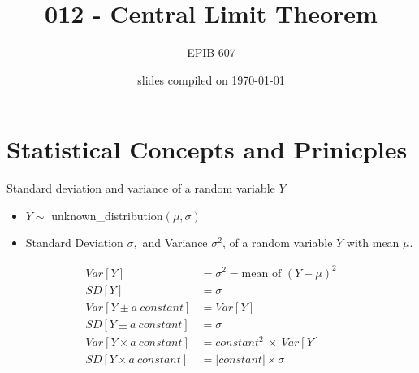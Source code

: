 \documentclass[10pt]{beamer}\usepackage[]{graphicx}\usepackage[]{color}
\begin{document}
	
	
	
	
	\title{012 - Central Limit Theorem}
	\author{EPIB 607}
	
	\date{slides compiled on \today}
	
	\maketitle

\section{Statistical Concepts and Prinicples}


\begin{frame}{Standard deviation and variance of a random variable $Y$}
	\begin{itemize}
		\tightlist
		\item $Y \sim$ unknown\_distribution$(\mu, \sigma)$
		\item Standard Deviation \(\sigma,\) and Variance \(\sigma^2\), of a random variable \(Y\) with mean \(\mu\).
	\end{itemize}

\begin{align*}
Var[Y] &= \sigma^2 = \textrm{mean of } (Y - \mu)^2 \\
SD[Y] &= \sigma \\
Var[Y \pm a \ constant] &= Var[Y] \\
SD[Y \pm a \ constant] &= \sigma \\
Var[Y \times a \ constant] &= constant^2 \ \times \ Var[Y] \\
SD[Y \times a \ constant] &= |constant| \times \sigma
\end{align*}	


\end{frame}
\end{document}
